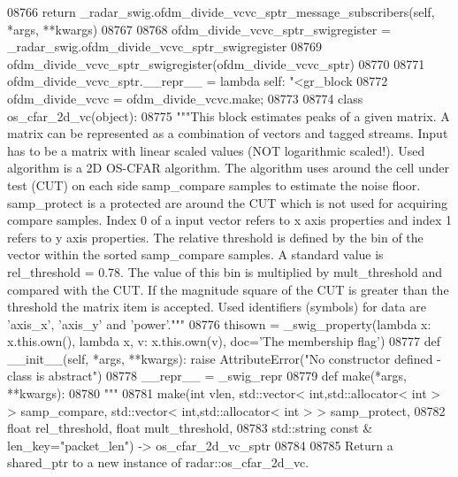 \begin{DoxyCode}
{{{{{{{{{{{{{{{{{{{{{{{{{{{{08766         \textcolor{keywordflow}{return} \_radar\_swig.ofdm\_divide\_vcvc\_sptr\_message\_subscribers(self, *args, **kwargs)
08767 
08768 ofdm\_divide\_vcvc\_sptr\_swigregister = \_radar\_swig.ofdm\_divide\_vcvc\_sptr\_swigregister
08769 ofdm_divide_vcvc_sptr_swigregister(ofdm\_divide\_vcvc\_sptr)
08770 
08771 ofdm\_divide\_vcvc\_sptr.\_\_repr\_\_ = \textcolor{keyword}{lambda} self: \textcolor{stringliteral}{"<gr\_block %
08772 ofdm\_divide\_vcvc = ofdm\_divide\_vcvc.make;
08773 
08774 \textcolor{keyword}{class }os_cfar_2d_vc(object):
08775     \textcolor{stringliteral}{"""This block estimates peaks of a given matrix. A matrix can be represented as a combination of
       vectors and tagged streams. Input has to be a matrix with linear scaled values (NOT logarithmic scaled!). Used
       algorithm is a 2D OS-CFAR algorithm. The algorithm uses around the cell under test (CUT) on each side
       samp\_compare samples to estimate the noise floor. samp\_protect is a protected are around the CUT which is not used
       for acquiring compare samples. Index 0 of a input vector refers to x axis properties and index 1 refers to y
       axis properties. The relative threshold is defined by the bin of the vector within the sorted samp\_compare
       samples. A standard value is rel\_threshold = 0.78. The value of this bin is multiplied by mult\_threshold and
       compared with the CUT. If the magnitude square of the CUT is greater than the threshold the matrix item is
       accepted. Used identifiers (symbols) for data are 'axis\_x', 'axis\_y' and 'power'."""}
08776     thisown = _swig_property(\textcolor{keyword}{lambda} x: x.this.own(), \textcolor{keyword}{lambda} x, v: x.this.own(v), doc=\textcolor{stringliteral}{'The membership flag'})
08777     \textcolor{keyword}{def }__init__(self, *args, **kwargs): \textcolor{keywordflow}{raise} AttributeError(\textcolor{stringliteral}{"No constructor defined - class is abstract"})
08778     \_\_repr\_\_ = \_swig\_repr
08779     \textcolor{keyword}{def }make(*args, **kwargs):
08780         \textcolor{stringliteral}{"""}
08781 \textcolor{stringliteral}{        make(int vlen, std::vector< int,std::allocator< int > > samp\_compare, std::vector<
       int,std::allocator< int > > samp\_protect, }
08782 \textcolor{stringliteral}{            float rel\_threshold, float mult\_threshold, }
08783 \textcolor{stringliteral}{            std::string const & len\_key="packet\_len") -> os\_cfar\_2d\_vc\_sptr}
08784 \textcolor{stringliteral}{}
08785 \textcolor{stringliteral}{        Return a shared\_ptr to a new instance of radar::os\_cfar\_2d\_vc.}
}}}}}}}}}}}}}}}}}}}}}}}}}}}}}
\end{DoxyCode}
